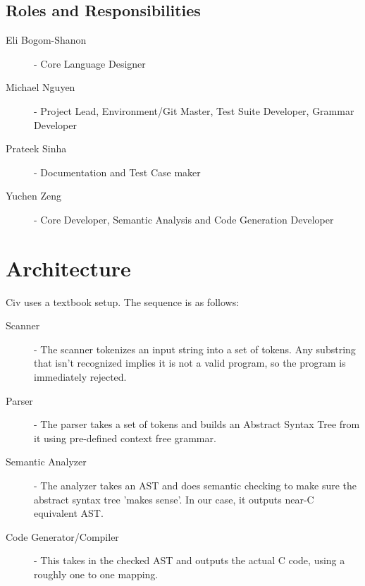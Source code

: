 \documentclass[a4paper]{article}
\begin{document}
\subsection{Roles and Responsibilities}
\begin{description}
\item[Eli Bogom-Shanon] - Core Language Designer
\item[Michael Nguyen] - Project Lead, Environment/Git Master, Test Suite Developer, Grammar Developer
\item[Prateek Sinha] - Documentation and Test Case maker
\item[Yuchen Zeng] - Core Developer, Semantic Analysis and Code Generation Developer
\end{description}

\section{Architecture}
Civ uses a textbook setup. The sequence is as follows:
\begin{description}
    \item[Scanner] - The scanner tokenizes an input string into a set of tokens. Any substring that isn't recognized implies it is not a valid program, so the program is immediately rejected.
    \item[Parser] - The parser takes a set of tokens and builds an Abstract Syntax Tree from it using pre-defined context free grammar.
    \item[Semantic Analyzer] - The analyzer takes an AST and does semantic checking to make sure the abstract syntax tree 'makes sense'. In our case, it outputs near-C equivalent AST.
    \item[Code Generator/Compiler] - This takes in the checked AST and outputs the actual C code, using a roughly one to one mapping.
\end{description} 
    \begin{figure}
    \end{figure}
\end{document}
